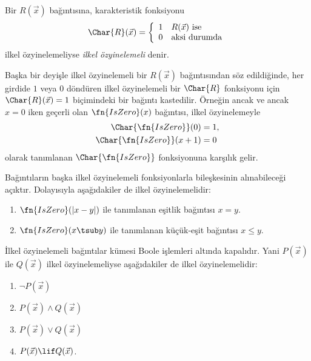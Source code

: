 


\begin{defn}
Bir $R(\vec x)$ bağıntısına, karakteristik fonksiyonu
\[
\Char{R}(\vec x)=\left\{
  \begin{array}{ll}
    1 & \mbox{$R(\vec x)$ ise}\\
    0 & \mbox{aksi durumda}
  \end{array}
\right.
\]
ilkel özyinelemeliyse \emph{ilkel özyinelemeli} denir.
\end{defn}

Başka bir deyişle ilkel özyinelemeli bir $R(\vec x)$ bağıntısından söz
edildiğinde, her girdide $1$ veya $0$ döndüren ilkel özyinelemeli bir
$\Char{R}$ fonksiyonu için $\Char{R}(\vec x)=1$ biçimindeki bir bağıntı
kastedilir. Örneğin ancak ve ancak $x=0$ iken geçerli olan
$\fn{IsZero}(x)$ bağıntısı, ilkel özyinelemeyle
\begin{align*}
  \Char{\fn{IsZero}}(0) & = 1,\\
  \Char{\fn{IsZero}}(x+1) & = 0
\end{align*}
olarak tanımlanan $\Char{\fn{IsZero}}$ fonksiyonuna karşılık gelir.

Bağıntıların başka ilkel özyinelemeli fonksiyonlarla bileşkesinin
alınabileceği açıktır. Dolayısıyla aşağıdakiler de ilkel özyinelemelidir:
\begin{enumerate}
\item $\fn{IsZero}(\lvert x-y\rvert)$ ile tanımlanan eşitlik bağıntısı
  $x=y$.
\item $\fn{IsZero}(x\tsub y)$ ile tanımlanan küçük-eşit bağıntısı
  $x\leq y$.
\end{enumerate}

\begin{prop}
  İlkel özyinelemeli bağıntılar kümesi Boole işlemleri altında kapalıdır.
  Yani $P(\vec x)$ ile $Q(\vec x)$ ilkel özyinelemeliyse aşağıdakiler de
  ilkel özyinelemelidir:
  \begin{enumerate}
  \item $\lnot P(\vec x)$
  \item $P(\vec x)\land Q(\vec x)$
  \item $P(\vec x)\lor Q(\vec x)$
  \item $P(\vec x)\lif Q(\vec x)$.
  \end{enumerate}
\end{prop}

